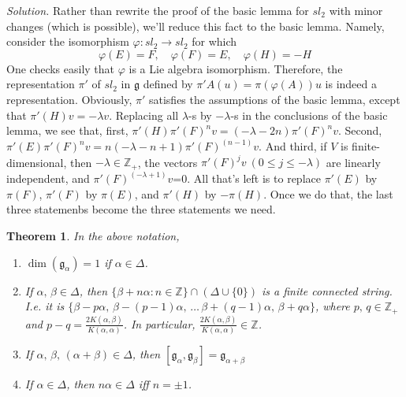 \documentclass{article}
\newtheorem{theorem}[prop]{Theorem}
\begin{document}
\emph{Solution.} Rather than rewrite the proof of the basic lemma for $sl_2$ with minor changes (which is possible), we'll reduce this fact to the basic lemma. Namely, consider the isomorphism $\varphi : sl_2 \to sl_2$ for which
$$
\varphi(E)=F, \quad \varphi(F)=E, \quad \varphi(H)=-H
$$
One checks easily that $\varphi$ is a Lie algebra isomorphism. Therefore, the representation $\pi '$ of $sl_2$ in ${\mathfrak g}$ defined by $\pi 'A(u) = \pi (\varphi (A))u$ is indeed a representation. Obviously, $\pi '$ satisfies the assumptions of the basic lemma, except that $\pi' (H) v = -\lambda v$. Replacing all $\lambda$-s by $-\lambda$-s in the conclusions of the basic lemma, we see that, first, $\pi' (H) \pi' (F)^n v = (-\lambda - 2n) \pi' (F)^n v$. Second, $\pi'(E) \pi' (F)^n v = n(-\lambda - n + 1) \pi' (F)^{(n-1)}v$. And third, if $V$ is finite-dimensional, then $-\lambda \in \mathbb{Z}_+$, the vectors $\pi'(F)^j v \ (0 \leq j \leq -\lambda)$ are linearly independent, and $\pi'(F)^{(-\lambda + 1)}v$=0. All that's left is to replace $\pi' (E)$ by $\pi (F)$, $\pi'(F)$ by $\pi (E)$, and $\pi'(H)$  by $-\pi(H)$. Once we do that, the last three statemenbs become the three statements we need.

\begin{theorem} In the above notation,
\begin{enumerate}
\item \label{Thirteen_Eight} $\dim ({\mathfrak g}_\alpha) = 1$ if $\alpha \in \Delta$.
\item \label{Thirteen_Nine} If $\alpha,\, \beta \in \Delta$, then $\{ \beta + n \alpha : n \in \mathbb{Z}\} \cap (\Delta \cup \{ 0 \})$ is a finite connected string. I.e. it is $\{\beta - p\alpha,\, \beta - (p-1)\alpha,\, \ldots\, \beta+(q-1)\alpha,\, \beta + q\alpha\}$, where $p,\, q \in \mathbb{Z}_+$ and $p-q= \frac{2K(\alpha, \beta)}{K(\alpha, \alpha)}$. In particular, $\frac{2K(\alpha, \beta)}{K(\alpha, \alpha)} \in \mathbb{Z}$.
\item \label{Thirteen_Ten} If $\alpha,\, \beta,\, (\alpha + \beta) \in \Delta$, then $[{\mathfrak g}_\alpha, {\mathfrak g}_\beta]={\mathfrak g}_{\alpha + \beta}$
\item \label{Thirteen_Eleven} If $\alpha \in \Delta$, then $n\alpha \in \Delta$ iff $n= \pm 1$.
\end{enumerate}
\end{theorem}
\end{document}
